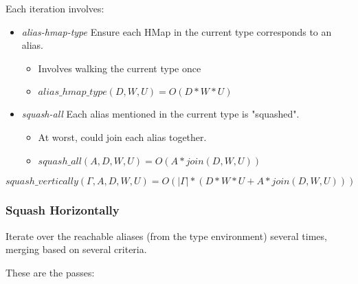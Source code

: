 Each iteration involves:

\begin{itemize}
  \item \emph{alias-hmap-type} Ensure each HMap in the current type corresponds to an alias.
		\begin{itemize}
			\item Involves walking the current type once
			\item $alias\_hmap\_type(D,W,U) = O(D*W*U)$
		\end{itemize}
  \item \emph{squash-all} Each alias mentioned in the current type is "squashed".
		\begin{itemize}
			\item At worst, could join each alias together.
			\item $squash\_all(A,D,W,U) = O(A*join(D, W, U))$
		\end{itemize}
\end{itemize}

\[
squash\_vertically(\Gamma, A, D, W, U) = O(|\Gamma| * (D*W*U + A*join(D, W, U)))
\]

\subsubsection{Squash Horizontally}
\label{squash-horizontally}

Iterate over the reachable aliases (from the type environment)
several times, merging based on several criteria.

These are the passes:


